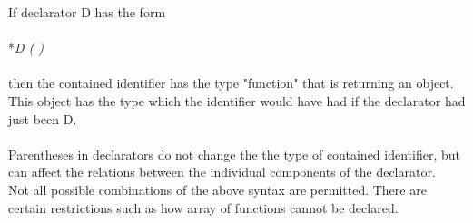 If declarator D has the form\\
		\\*\indent\indent\textit{D ( )}\\\\
then the contained identifier has the type "function" that is returning an object. This object has the type which the identifier would have had if the declarator had just been D.\\\\

Parentheses in declarators do not change the the type of contained identifier, but can affect the relations between the individual components of the declarator.\\

Not all possible combinations of the above syntax are permitted. There are certain restrictions such as how array of functions cannot be declared.
